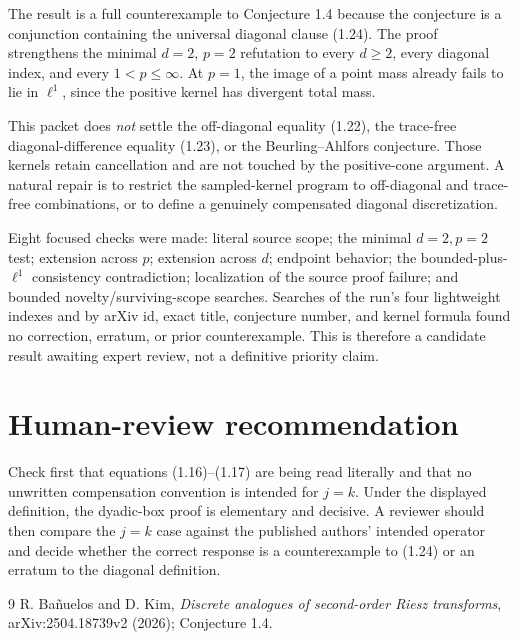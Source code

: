 \documentclass[11pt]{article}
\begin{document}
The result is a full counterexample to Conjecture 1.4 because the conjecture
is a conjunction containing the universal diagonal clause (1.24).  The proof
strengthens the minimal $d=2$, $p=2$ refutation to every $d\geq2$, every
diagonal index, and every $1<p\leq\infty$.  At $p=1$, the image of a point
mass already fails to lie in $\ell^1$, since the positive kernel has divergent
total mass.

This packet does \emph{not} settle the off-diagonal equality (1.22), the
trace-free diagonal-difference equality (1.23), or the Beurling--Ahlfors
conjecture.  Those kernels retain cancellation and are not touched by the
positive-cone argument.  A natural repair is to restrict the sampled-kernel
program to off-diagonal and trace-free combinations, or to define a genuinely
compensated diagonal discretization.

Eight focused checks were made: literal source scope; the minimal
$d=2,p=2$ test; extension across $p$; extension across $d$; endpoint behavior;
the bounded-plus-$\ell^1$ consistency contradiction; localization of the
source proof failure; and bounded novelty/surviving-scope searches.  Searches
of the run's four lightweight indexes and by arXiv id, exact title, conjecture
number, and kernel formula found no correction, erratum, or prior
counterexample.  This is therefore a candidate result awaiting expert review,
not a definitive priority claim.

\section*{Human-review recommendation}

Check first that equations (1.16)--(1.17) are being read literally and that no
unwritten compensation convention is intended for $j=k$.  Under the displayed
definition, the dyadic-box proof is elementary and decisive.  A reviewer
should then compare the $j=k$ case against the published authors' intended
operator and decide whether the correct response is a counterexample to
(1.24) or an erratum to the diagonal definition.

\begin{thebibliography}{9}
R. Bañuelos and D. Kim,
\emph{Discrete analogues of second-order Riesz transforms},
arXiv:2504.18739v2 (2026); Conjecture 1.4.
\end{thebibliography}
\end{document}
